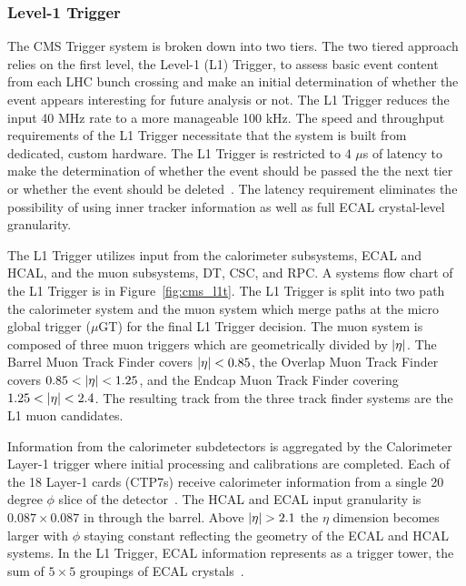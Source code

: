 \subsubsection{Level-1 Trigger}
The CMS Trigger system is broken down into two tiers. The two tiered approach relies on
the first level, the Level-1 (L1) Trigger, to assess basic event content from each LHC
bunch crossing and make an initial determination of whether the event appears interesting for
future analysis or not. The L1 Trigger reduces the input 40 MHz rate to a more manageable
100 kHz. The speed and throughput requirements of the L1 Trigger necessitate that the system 
is built from dedicated, custom hardware. The L1 Trigger is restricted to 4 $\mu$s of latency
to make the determination of whether the event should be passed the the next tier or whether
the event should be deleted~\cite{Khachatryan:2016bia}. The latency requirement eliminates
the possibility of using inner tracker information as well as full ECAL crystal-level
granularity.

The L1 Trigger utilizes input from the calorimeter subsystems, ECAL and HCAL, and the muon 
subsystems, DT, CSC, and RPC. A systems flow chart of the L1 Trigger is in
Figure~\ref{fig:cms_l1t}. The L1 Trigger is split into two path the calorimeter system
and the muon system which merge paths at the micro global trigger ($\mu$GT) for the
final L1 Trigger decision. The muon system is composed of three muon triggers which are
geometrically divided by $\lvert\eta\rvert$. The Barrel Muon Track Finder covers $\lvert\eta\rvert < 0.85$,
the Overlap Muon Track Finder covers $0.85 < \lvert\eta\rvert < 1.25$, and the Endcap Muon
Track Finder covering $1.25 < \lvert\eta\rvert < 2.4$. The resulting track from the three
track finder systems are the L1 muon candidates.

Information from the calorimeter subdetectors is aggregated by the
Calorimeter Layer-1 trigger where initial processing and calibrations are completed.
Each of the 18 Layer-1 cards (CTP7s) receive calorimeter information from a single 20 degree $\phi$ slice 
of the detector~\cite{Cadamuro:2017slr}. The HCAL and ECAL input granularity is $0.087 \times 0.087$ in \etaphi
through the barrel. Above $\lvert\eta\rvert > 2.1$ the $\eta$ dimension becomes larger with $\phi$
staying constant reflecting the geometry of the ECAL and HCAL systems. In the L1 Trigger, 
ECAL information represents as a trigger tower, the sum of $5 \times 5$ groupings of 
ECAL crystals~\cite{Khachatryan:2016bia}.

